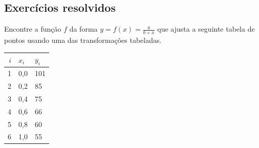 \subsection*{Exercícios resolvidos}

\begin{exeresol}
Encontre a função $f$ da forma $y=f(x)=\frac{a}{b+x}$ que ajusta a seguinte tabela de pontos usando uma das transformações tabeladas.
\begin{center}
  \begin{tabular}{|r|l|l|}
    $i$ & $x_i$ & $y_i$\\\hline
    1 & 0,0 & 101\\
    2 & 0,2 &  85\\
    3 & 0,4 &  75\\
    4 & 0,6 &  66\\
    5 & 0,8 &  60\\
    6 & 1,0 &  55\\\hline
  \end{tabular}
\end{center}
\end{exeresol}
